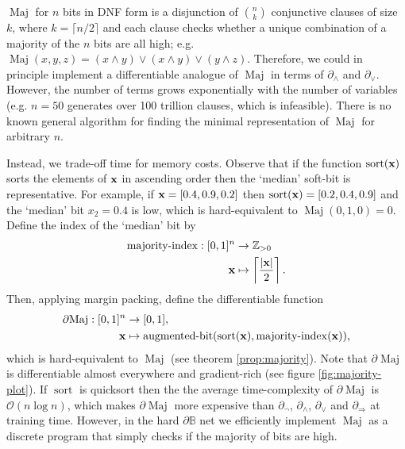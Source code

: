 \documentclass{article} %
\begin{document}
$\operatorname{Maj}$ for $n$ bits in DNF form is a disjunction of $\binom{n}{k}$ conjunctive clauses of size $k$, where $k=\lceil n/2 \rceil$ and each clause checks whether a unique combination of a majority of the $n$ bits are all high; e.g. $\operatorname{Maj}(x, y, z) = (x \wedge y) \vee (x \wedge y) \vee (y \wedge z)$. Therefore, we could in principle implement a differentiable analogue of $\operatorname{Maj}$ in terms of $\partial_{\wedge}$ and $\partial_{\vee}$. However, the number of terms grows exponentially with the number of variables (e.g. $n=50$ generates over 100 trillion clauses, which is infeasible). There is no known general algorithm for finding the minimal representation of $\operatorname{Maj}$ for arbitrary $n$.

Instead, we trade-off time for memory costs. Observe that if the function $\operatorname{sort}({\bf x})$ sorts the elements of ${\bf x}$ in ascending order then the `median' soft-bit is representative. For example, if ${\bf x} = [0.4, 0.9, 0.2]$ then $\operatorname{sort}({\bf x}) = [0.2, 0.4, 0.9]$ and the `median' bit $x_{2}=0.4$ is low, which is hard-equivalent to $\operatorname{Maj}(0, 1, 0) = 0$. Define the index of the `median' bit by
\begin{equation*}
\begin{aligned}
\operatorname{majority-index}: [0, 1]^{n} & \to \mathbb{Z}_{> 0}\\
{\bf x} & \mapsto \left\lceil \frac{|{\bf x}|}{2} \right\rceil
\text{.}
\end{aligned}
\end{equation*}
Then, applying margin packing, define the differentiable function
\begin{equation*}
\begin{aligned}
	\partial\!\operatorname{Maj}: [0,1]^{n} &\to [0,1], \\
	{\bf x} &\mapsto \operatorname{augmented-bit}(\operatorname{sort}({\bf x}), \operatorname{majority-index}({\bf x}))\text{,}
\end{aligned}
\end{equation*}
which is hard-equivalent to $\operatorname{Maj}$ (see theorem \ref{prop:majority}). Note that $\partial\!\operatorname{Maj}$ is differentiable almost everywhere and gradient-rich (see figure \ref{fig:majority-plot}). If $\operatorname{sort}$ is quicksort then the the average time-complexity of $\partial\!\operatorname{Maj}$ is $\mathcal{O}(n\log{}n)$, which makes $\partial\!\operatorname{Maj}$ more expensive than $\partial_{\neg}$, $\partial_{\wedge}$, $\partial_{\vee}$ and $\partial_{\Rightarrow}$ at training time. However, in the hard $\partial\mathbb{B}$ net we efficiently implement $\operatorname{Maj}$ as a discrete program that simply checks if the majority of bits are high.
\end{document}
